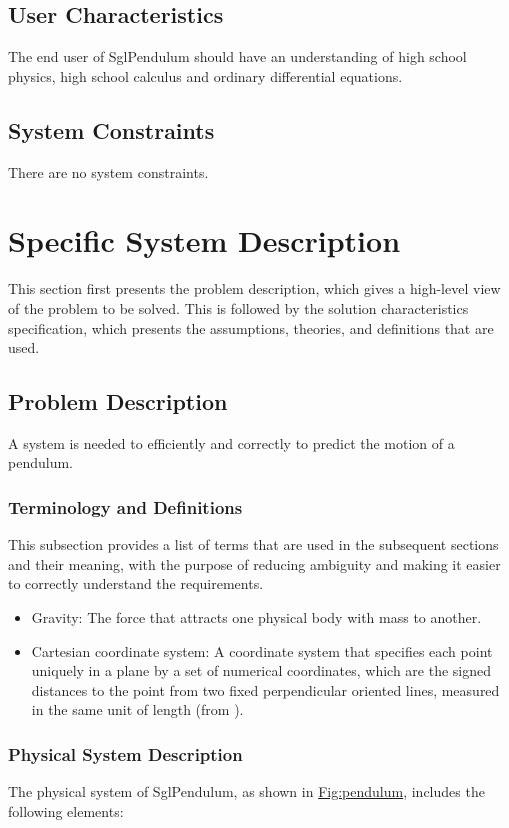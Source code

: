 \documentclass[12pt]{article}
\begin{document}
\subsection{User Characteristics}
\label{Sec:UserChars}
The end user of SglPendulum should have an understanding of high school physics, high school calculus and ordinary differential equations.

\subsection{System Constraints}
\label{Sec:SysConstraints}
There are no system constraints.

\section{Specific System Description}
\label{Sec:SpecSystDesc}
This section first presents the problem description, which gives a high-level view of the problem to be solved. This is followed by the solution characteristics specification, which presents the assumptions, theories, and definitions that are used.

\subsection{Problem Description}
\label{Sec:ProbDesc}
A system is needed to efficiently and correctly to predict the motion of a pendulum.

\subsubsection{Terminology and Definitions}
\label{Sec:TermDefs}
This subsection provides a list of terms that are used in the subsequent sections and their meaning, with the purpose of reducing ambiguity and making it easier to correctly understand the requirements.

\begin{itemize}
\item{Gravity: The force that attracts one physical body with mass to another.}
\item{Cartesian coordinate system: A coordinate system that specifies each point uniquely in a plane by a set of numerical coordinates, which are the signed distances to the point from two fixed perpendicular oriented lines, measured in the same unit of length (from \cite{cartesianWiki}).}
\end{itemize}
\subsubsection{Physical System Description}
\label{Sec:PhysSyst}
The physical system of SglPendulum, as shown in \hyperref[Figure:pendulum]{Fig:pendulum}, includes the following elements:
\end{document}
